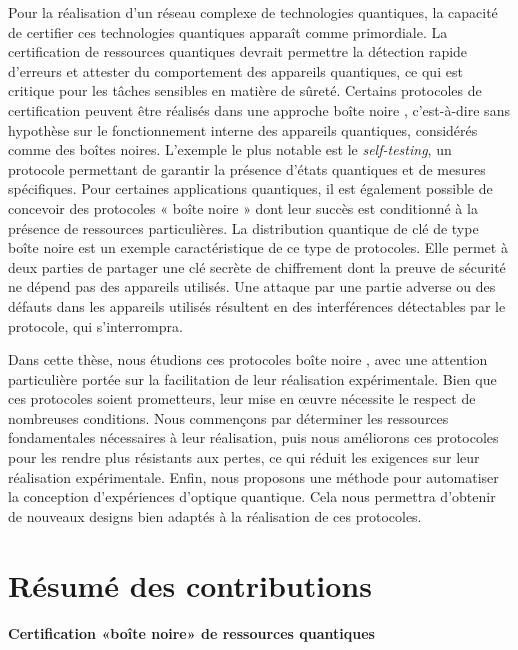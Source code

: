 \medbreak

Pour la réalisation d'un réseau complexe de technologies quantiques, la capacité de certifier ces technologies quantiques apparaît comme primordiale. 
La certification de ressources quantiques devrait permettre la détection rapide d'erreurs et attester du comportement des appareils quantiques, ce qui est critique pour les tâches sensibles en matière de sûreté.
Certains protocoles de certification peuvent être réalisés dans une approche \guillemotleft boîte noire \guillemotright, c'est-à-dire sans hypothèse sur le fonctionnement interne des appareils quantiques, considérés comme des boîtes noires. 
L'exemple le plus notable est le \textit{self-testing}, un protocole permettant de garantir la présence d'états quantiques et de mesures spécifiques.
Pour certaines applications quantiques, il est également possible de concevoir des protocoles « boîte noire » dont leur succès est conditionné à la présence de ressources particulières.
La distribution quantique de clé de type \guillemotleft boîte noire \guillemotright est un exemple caractéristique de ce type de protocoles. Elle permet à deux parties de partager une clé secrète de chiffrement dont la preuve de sécurité ne dépend pas des appareils utilisés. 
Une attaque par une partie adverse ou des défauts dans les appareils utilisés résultent en des interférences détectables par le protocole, qui s'interrompra.

\medbreak

Dans cette thèse, nous étudions ces protocoles \guillemotleft boîte noire \guillemotright, avec une attention particulière portée sur la facilitation de leur réalisation expérimentale.
Bien que ces protocoles soient prometteurs, leur mise en œuvre nécessite le respect de nombreuses conditions. 
Nous commençons par déterminer les ressources fondamentales nécessaires à leur réalisation, puis nous améliorons ces protocoles pour les rendre plus résistants aux pertes, ce qui réduit les exigences sur leur réalisation expérimentale. 
Enfin, nous proposons une méthode pour automatiser la conception d'expériences d'optique quantique. 
Cela nous permettra d'obtenir de nouveaux designs bien adaptés à la réalisation de ces protocoles.


\section{Résumé des contributions}

\paragraph{Certification «boîte noire» de ressources quantiques} 

